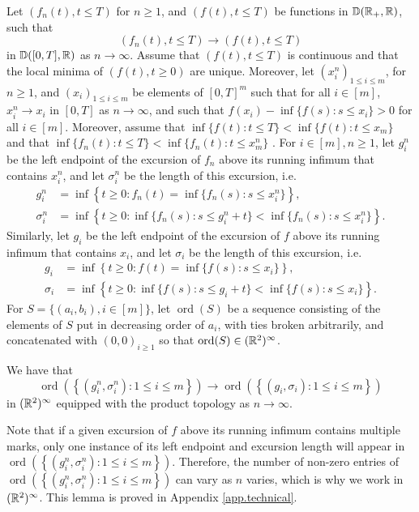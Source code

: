 Let $(f_n(t), t\leq T )$ for $n\geq 1$, and $(f(t),t\leq  T)$ be functions in ${\mathbb D}({\mathbb R}_+,{\mathbb R})$, such that 
$$(f_n(t), t\leq T)\to (f(t),t\leq  T)$$ in ${\mathbb D}([0,T],{\mathbb R})$ as $n\to \infty$. Assume that $(f(t),t\leq T )$ is continuous and that the local minima of $(f(t),t\geq 0)$ are unique. Moreover, let $(x_i^n)_{1\leq i\leq m}$, for $n\geq 1$, and $(x_i)_{1\leq i\leq m}$ be elements of $[0,T]^{m}$ such that for all $i\in [m]$, $x_i^n\to x_i$ in $[0,T]$ as $n\to \infty$, and such that $f(x_i)-\inf\{f(s):s\leq x_i\}>0$ for all $i\in [m]$. Moreover, assume that $\inf\{f(t):t\leq T\}<\inf\{f(t):t\leq x_m\}$ and that $\inf\{f_n(t):t\leq T\}<\inf\{f_n(t):t\leq x^n_m\}$ . For $i \in [m], n \geq 1$, let $g_i^n$ be the left endpoint of the excursion of $f_n$ above its running infimum that contains $x_i^n$, and let $\sigma_i^n$ be the length of this excursion, i.e. 
\begin{align*}
    g_i^n&=\inf\left\{t\geq 0:f_n(t)=\inf\{f_n(s):s\leq x_i^n\}\right\}, \\
    \sigma_i^n&=\inf\left\{ t\geq 0: \inf\{f_n(s):s\leq g_i^n+t\} < \inf\{f_n(s):s\leq x_i^n\}\right\}.
\end{align*}
Similarly, let $g_i$ be the left endpoint of the excursion of $f$ above its running infimum that contains $x_i$, and let $\sigma_i$ be the length of this excursion, i.e. 
\begin{align*}
    g_i&=\inf\left\{t\geq 0:f(t)=\inf\{f(s):s\leq x_i\}\right\}, \\
    \sigma_i&=\inf\left\{ t\geq 0: \inf\{f(s):s\leq g_i+ t\} < \inf\{f(s):s\leq x_i\}\right\}.
\end{align*}
For $S=\{(a_i,b_i), i\in [m]\}$, let $\operatorname{ord}(S)$ be a sequence consisting of the elements of $S$ put in decreasing order of $a_i$, with ties broken arbitrarily, and concatenated with $(0,0)_{i\geq 1}$ so that $\operatorname{ord}(S)\in ({\mathbb R}^2)^\infty$.

\begin{lemma}\label{lemma.extractexcursions}
We have that 
$$\operatorname{ord}\left(\left\{(g_i^n,\sigma_i^n):1\leq i \leq m\right\}\right)\to \operatorname{ord}\left(\left\{(g_i,\sigma_i):1\leq i \leq m\right\}\right)$$
in $({\mathbb R}^{2})^\infty$ equipped with the product topology as $n\to \infty$. 
\end{lemma}
Note that if a given excursion of $f$ above its running infimum contains multiple marks, only one instance of its left endpoint and excursion length will appear in $\operatorname{ord}\left(\left\{(g_i^n,\sigma_i^n):1\leq i \leq m\right\}\right)$. Therefore, the number of non-zero entries of $\operatorname{ord}\left(\left\{(g_i^n,\sigma_i^n):1\leq i \leq m\right\}\right)$ can vary as $n$ varies, which is why we work in  $({\mathbb R}^{2})^\infty$. This lemma is proved in Appendix \ref{app.technical}. 

